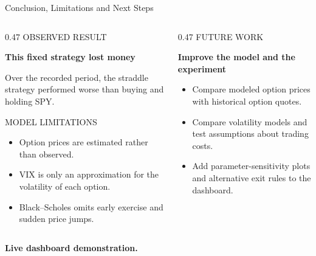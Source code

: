 \documentclass[10pt,aspectratio=169]{beamer}
\newcommand{\eyebrow}[1]{{\footnotesize\color{GraphGray}#1}\par\vspace{0.07cm}}
\newcommand{\bigpoint}[1]{{\large\bfseries #1}\par}
\begin{document}
\begin{frame}{Conclusion, Limitations and Next Steps}
\vspace{0.15cm}
\begin{columns}[T,onlytextwidth]
\begin{column}{0.47\textwidth}
\eyebrow{OBSERVED RESULT}
\bigpoint{This fixed strategy lost money}
\vspace{0.17cm}
{\small Over the recorded period, the straddle strategy performed worse than buying and holding SPY.}\par
\vspace{0.34cm}
\eyebrow{MODEL LIMITATIONS}
\begin{itemize}\setlength{\itemsep}{0.16cm}
\item Option prices are estimated rather than observed.
\item VIX is only an approximation for the volatility of each option.
\item Black--Scholes omits early exercise and sudden price jumps.
\end{itemize}
\end{column}
\begin{column}{0.47\textwidth}
\eyebrow{FUTURE WORK}
\bigpoint{Improve the model and the experiment}
\vspace{0.20cm}
\begin{itemize}\setlength{\itemsep}{0.28cm}
\item Compare modeled option prices with historical option quotes.
\item Compare volatility models and test assumptions about trading costs.
\item Add parameter-sensitivity plots and alternative exit rules to the dashboard.
\end{itemize}
\end{column}
\end{columns}
\vfill
{\large\bfseries\color{AccentBlue}Live dashboard demonstration.}\par
\end{frame}

\appendix
\end{document}
